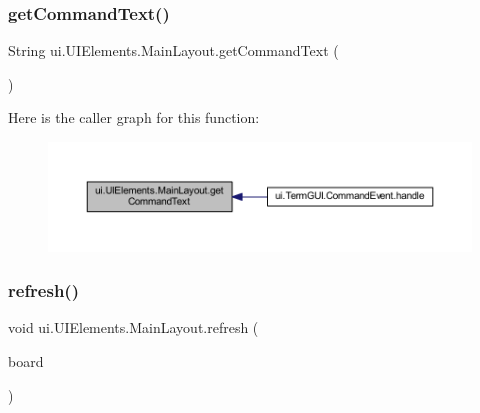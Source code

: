 \subsubsection{\texorpdfstring{get\+Command\+Text()}{getCommandText()}}
{\footnotesize\ttfamily String ui.\+U\+I\+Elements.\+Main\+Layout.\+get\+Command\+Text (\begin{DoxyParamCaption}{ }\end{DoxyParamCaption})\hspace{0.3cm}{\ttfamily [inline]}}

Here is the caller graph for this function\+:
\nopagebreak
\begin{figure}[H]
\begin{center}
\leavevmode
\includegraphics[width=350pt]{classui_1_1_u_i_elements_1_1_main_layout_acb9c306f6b806c4375e19e28316f191f_icgraph}
\end{center}
\end{figure}
\mbox{\label{classui_1_1_u_i_elements_1_1_main_layout_a7714bf456435ac3ab559b3bf6182c022}} 
\subsubsection{\texorpdfstring{refresh()}{refresh()}}
{\footnotesize\ttfamily void ui.\+U\+I\+Elements.\+Main\+Layout.\+refresh (\begin{DoxyParamCaption}\item[{\mbox{\hyperlink{classgame_1_1game_state_1_1_game_state}{Game\+State}}}]{board }\end{DoxyParamCaption})\hspace{0.3cm}{\ttfamily [inline]}}

